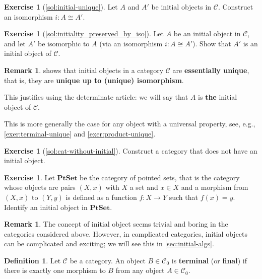 \documentclass[a4paper,10pt]{scrartcl}
\theoremstyle{plain}
\theoremstyle{definition}
\newtheorem{rem}[thm]{Remark}
\newtheorem{dfn}[thm]{Definition}
\newtheorem{exer}[thm]{Exercise}
\newcommand{\Cat}[1]{\mathcal{#1}}
\newcommand{\CC}{\Cat{C}}
\newcommand{\Catb}[1]{\mathbf{#1}}
\newcommand{\PTSET}{\Catb{PtSet}}
\newcommand{\Ob}[1]{{#1}_0}
\begin{document}
\begin{exer}[\cref{sol:initial-unique}]\label{exer:initial-unique}
  Let $A$ and $A'$ be initial objects in $\CC$. Construct an isomorphism $i : A \cong A'$.
\end{exer}

\begin{exer}[\cref{sol:initiality_preserved_by_iso}]\label{exer:initiality_preserved_by_iso}
  Let $A$ be an initial object in $\CC$, and let $A'$ be isomorphic to $A$ (via an isomorphism $i : A \cong A'$).
  Show that $A'$ is an initial object of $\CC$.
\end{exer}

\begin{rem}
   shows that initial objects in a category $\CC$ are \textbf{essentially unique}, that is, they are \textbf{unique up to (unique) isomorphism}.

  
  This justifies using the determinate article: we will say that $A$ is \textbf{the} initial object of $\CC$.

  
  This is more generally the case for any object with a universal property, see, e.g., \cref{exer:terminal-unique} and \cref{exer:product-unique}.
\end{rem}

\begin{exer}[\cref{sol:cat-without-initial}]\label{exer:cat-without-initial}
  Construct a category that does not have an initial object.
\end{exer}

\begin{exer} Let $\PTSET$ be the category of pointed sets, that is the category whose objects are pairs $(X,x)$ with $X$ a set and $x\in X$ and a morphism from $(X,x)$ to $(Y,y)$ is defined as a function $f:X\to Y$ such that $f(x)=y$. Identify an initial object in $\PTSET$.
\end{exer}

\begin{rem}
  The concept of initial object seems trivial and boring in the categories considered above.
  However, in complicated categories, initial objects can be complicated and exciting;
  we will see this in \cref{sec:initial-algs}.
\end{rem}

\begin{dfn}
  Let $\CC$ be a category. An object $B \in \Ob{\CC}$ is \textbf{terminal} (or \textbf{final}) if there is exactly one morphism to $B$ from any object $A \in \Ob{\CC}$.
\end{dfn}
\end{document}
